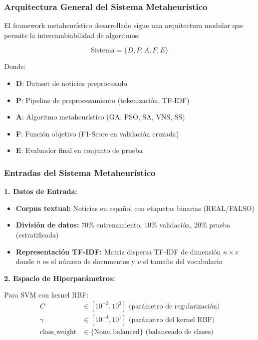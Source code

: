 \subsubsection{Arquitectura General del Sistema Metaheurístico}

El framework metaheurístico desarrollado sigue una arquitectura modular que permite la intercambiabilidad de algoritmos:

\begin{equation}
\text{Sistema} = \{D, P, A, F, E\}
\end{equation}

Donde:
\begin{itemize}
    \item \textbf{D}: Dataset de noticias preprocesado
    \item \textbf{P}: Pipeline de preprocesamiento (tokenización, TF-IDF)
    \item \textbf{A}: Algoritmo metaheurístico (GA, PSO, SA, VNS, SS)
    \item \textbf{F}: Función objetivo (F1-Score en validación cruzada)
    \item \textbf{E}: Evaluador final en conjunto de prueba
\end{itemize}

\subsubsection{Entradas del Sistema Metaheurístico}

\textbf{1. Datos de Entrada:}
\begin{itemize}
    \item \textbf{Corpus textual:} Noticias en español con etiquetas binarias (REAL/FALSO)
    \item \textbf{División de datos:} 70\% entrenamiento, 10\% validación, 20\% prueba (estratificada)
    \item \textbf{Representación TF-IDF:} Matriz dispersa TF-IDF de dimensión $n \times v$ donde $n$ es el número de documentos y $v$ el tamaño del vocabulario
\end{itemize}

\textbf{2. Espacio de Hiperparámetros:}

Para SVM con kernel RBF:
\begin{align}
C &\in [10^{-3}, 10^{3}] \text{ (parámetro de regularización)} \\
\gamma &\in [10^{-4}, 10^{1}] \text{ (parámetro del kernel RBF)} \\
\text{class\_weight} &\in \{\text{None}, \text{balanced}\} \text{ (balanceado de clases)}
\end{align}

